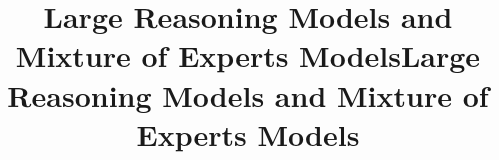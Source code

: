 \documentclass[10pt, aspectratio=149]{beamer}
\title[Large Reasoning Models and Mixture of Experts Models]{Large Reasoning Models and Mixture of Experts Models}
\begin{document}
\title[Large Reasoning Models and Mixture of Experts Models]{Large Reasoning Models and Mixture of Experts Models}












\end{document}
